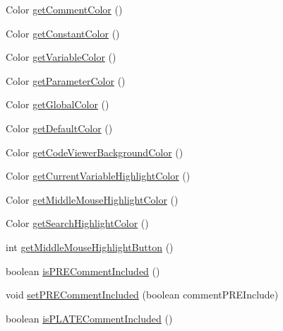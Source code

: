 \begin{DoxyCompactItemize}
Color \mbox{\hyperlink{classghidra_1_1app_1_1decompiler_1_1_decompile_options_a66c3d13d2f49f136534a566aa4b11a7e}{get\+Comment\+Color}} ()
\item 
Color \mbox{\hyperlink{classghidra_1_1app_1_1decompiler_1_1_decompile_options_afc4366b2f3bd93979223cbf6b87c4e1e}{get\+Constant\+Color}} ()
\item 
Color \mbox{\hyperlink{classghidra_1_1app_1_1decompiler_1_1_decompile_options_acd51d8cea703ab118d8777875140d98b}{get\+Variable\+Color}} ()
\item 
Color \mbox{\hyperlink{classghidra_1_1app_1_1decompiler_1_1_decompile_options_a202289ca4c4bdbec5ac9f2a19c42657a}{get\+Parameter\+Color}} ()
\item 
Color \mbox{\hyperlink{classghidra_1_1app_1_1decompiler_1_1_decompile_options_aa25d7b2d3a300164abe18b4f97f6020c}{get\+Global\+Color}} ()
\item 
Color \mbox{\hyperlink{classghidra_1_1app_1_1decompiler_1_1_decompile_options_a921763962895f1ab9391b9b9d06e9513}{get\+Default\+Color}} ()
\item 
Color \mbox{\hyperlink{classghidra_1_1app_1_1decompiler_1_1_decompile_options_ab805f3b221d2808b74624db5f2b7a74f}{get\+Code\+Viewer\+Background\+Color}} ()
\item 
Color \mbox{\hyperlink{classghidra_1_1app_1_1decompiler_1_1_decompile_options_ae698f1623b903cdf039ffed0bf8bbf16}{get\+Current\+Variable\+Highlight\+Color}} ()
\item 
Color \mbox{\hyperlink{classghidra_1_1app_1_1decompiler_1_1_decompile_options_aadf412f9419edb4b46b21a0c41b4ff25}{get\+Middle\+Mouse\+Highlight\+Color}} ()
\item 
Color \mbox{\hyperlink{classghidra_1_1app_1_1decompiler_1_1_decompile_options_a97b81417116151cd6481043496bd66f1}{get\+Search\+Highlight\+Color}} ()
\item 
int \mbox{\hyperlink{classghidra_1_1app_1_1decompiler_1_1_decompile_options_a4dec43e29cd680de2842fe819440c033}{get\+Middle\+Mouse\+Highlight\+Button}} ()
\item 
boolean \mbox{\hyperlink{classghidra_1_1app_1_1decompiler_1_1_decompile_options_a53327e182f160e79621205e9059fde07}{is\+P\+R\+E\+Comment\+Included}} ()
\item 
void \mbox{\hyperlink{classghidra_1_1app_1_1decompiler_1_1_decompile_options_a11de80712c303d9bf0f6b23f9bb3a269}{set\+P\+R\+E\+Comment\+Included}} (boolean comment\+P\+R\+E\+Include)
\item 
boolean \mbox{\hyperlink{classghidra_1_1app_1_1decompiler_1_1_decompile_options_a1c729cd491c6ddd420bb830821eb8bc5}{is\+P\+L\+A\+T\+E\+Comment\+Included}} ()

\end{DoxyCompactItemize}
